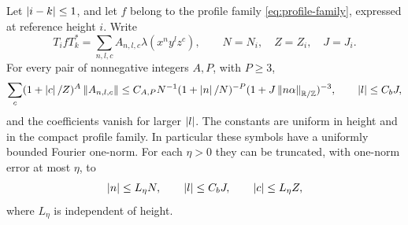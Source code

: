 \begin{lemma}
\label{lem:fourier-envelope}
Let \(\left\lvert i-k\right\rvert\leq1\), and let \(f\) belong to the profile family
\eqref{eq:profile-family}, expressed at reference height \(i\).  Write
\[
 T_i fT_k^*=\sum_{n,l,c}A_{n,l,c}\lambda(x^ny^lz^c),
 \qquad N=N_i,\quad Z=Z_i,\quad J=J_i.
\]
For every pair of nonnegative integers \(A,P\), with \(P\geq3\),
\begin{equation}
\label{eq:weighted-central-envelope}
 \sum_c(1+\left\lvert c\right\rvert/Z)^A\left\lVert A_{n,l,c}\right\rVert
 \leq C_{A,P}N^{-1}(1+\left\lvert n\right\rvert/N)^{-P}
       (1+J\left\lVert n\alpha\right\rVert_{\mathbb R/\mathbb Z})^{-3},
 \qquad \left\lvert l\right\rvert\leq C_bJ,
\end{equation}
and the coefficients vanish for larger \(\left\lvert l\right\rvert\).  The constants are uniform
in height and in the compact profile family.  In particular these symbols
have a uniformly bounded Fourier one-norm.  For each \(\eta>0\) they can be
truncated, with one-norm error at most \(\eta\), to
\begin{equation}
\label{eq:fourier-box}
 \left\lvert n\right\rvert\leq L_\eta N,\qquad \left\lvert l\right\rvert\leq C_bJ,\qquad
 \left\lvert c\right\rvert\leq L_\eta Z,
\end{equation}
where \(L_\eta\) is independent of height.
\end{lemma}

